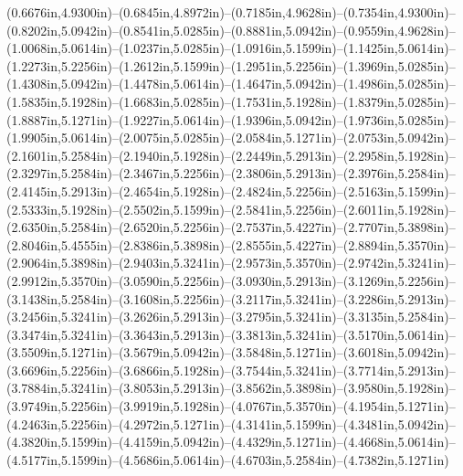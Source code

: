 (0.6676in,4.9300in)--(0.6845in,4.8972in)--(0.7185in,4.9628in)--(0.7354in,4.9300in)--(0.8202in,5.0942in)--(0.8541in,5.0285in)--(0.8881in,5.0942in)--(0.9559in,4.9628in)--(1.0068in,5.0614in)--(1.0237in,5.0285in)--(1.0916in,5.1599in)--(1.1425in,5.0614in)--(1.2273in,5.2256in)--(1.2612in,5.1599in)--(1.2951in,5.2256in)--(1.3969in,5.0285in)--(1.4308in,5.0942in)--(1.4478in,5.0614in)--(1.4647in,5.0942in)--(1.4986in,5.0285in)--(1.5835in,5.1928in)--(1.6683in,5.0285in)--(1.7531in,5.1928in)--(1.8379in,5.0285in)--(1.8887in,5.1271in)--(1.9227in,5.0614in)--(1.9396in,5.0942in)--(1.9736in,5.0285in)--(1.9905in,5.0614in)--(2.0075in,5.0285in)--(2.0584in,5.1271in)--(2.0753in,5.0942in)--(2.1601in,5.2584in)--(2.1940in,5.1928in)--(2.2449in,5.2913in)--(2.2958in,5.1928in)--(2.3297in,5.2584in)--(2.3467in,5.2256in)--(2.3806in,5.2913in)--(2.3976in,5.2584in)--(2.4145in,5.2913in)--(2.4654in,5.1928in)--(2.4824in,5.2256in)--(2.5163in,5.1599in)--(2.5333in,5.1928in)--(2.5502in,5.1599in)--(2.5841in,5.2256in)--(2.6011in,5.1928in)--(2.6350in,5.2584in)--(2.6520in,5.2256in)--(2.7537in,5.4227in)--(2.7707in,5.3898in)--(2.8046in,5.4555in)--(2.8386in,5.3898in)--(2.8555in,5.4227in)--(2.8894in,5.3570in)--(2.9064in,5.3898in)--(2.9403in,5.3241in)--(2.9573in,5.3570in)--(2.9742in,5.3241in)--(2.9912in,5.3570in)--(3.0590in,5.2256in)--(3.0930in,5.2913in)--(3.1269in,5.2256in)--(3.1438in,5.2584in)--(3.1608in,5.2256in)--(3.2117in,5.3241in)--(3.2286in,5.2913in)--(3.2456in,5.3241in)--(3.2626in,5.2913in)--(3.2795in,5.3241in)--(3.3135in,5.2584in)--(3.3474in,5.3241in)--(3.3643in,5.2913in)--(3.3813in,5.3241in)--(3.5170in,5.0614in)--(3.5509in,5.1271in)--(3.5679in,5.0942in)--(3.5848in,5.1271in)--(3.6018in,5.0942in)--(3.6696in,5.2256in)--(3.6866in,5.1928in)--(3.7544in,5.3241in)--(3.7714in,5.2913in)--(3.7884in,5.3241in)--(3.8053in,5.2913in)--(3.8562in,5.3898in)--(3.9580in,5.1928in)--(3.9749in,5.2256in)--(3.9919in,5.1928in)--(4.0767in,5.3570in)--(4.1954in,5.1271in)--(4.2463in,5.2256in)--(4.2972in,5.1271in)--(4.3141in,5.1599in)--(4.3481in,5.0942in)--(4.3820in,5.1599in)--(4.4159in,5.0942in)--(4.4329in,5.1271in)--(4.4668in,5.0614in)--(4.5177in,5.1599in)--(4.5686in,5.0614in)--(4.6703in,5.2584in)--(4.7382in,5.1271in)
